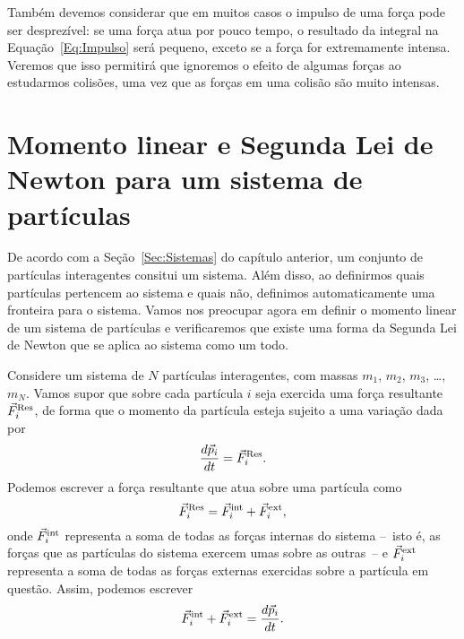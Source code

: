 Também devemos considerar que em muitos casos o impulso de uma força pode ser desprezível: se uma força atua por pouco tempo, o resultado da integral na Equação~\eqref{Eq:Impulso} será pequeno, exceto se a força for extremamente intensa. Veremos que isso permitirá que ignoremos o efeito de algumas forças ao estudarmos colisões, uma vez que as forças em uma colisão são muito intensas.

\section{Momento linear e Segunda Lei de Newton para um sistema de partículas}

De acordo com a Seção~\ref{Sec:Sistemas} do capítulo anterior, um conjunto de partículas interagentes consitui um sistema. Além disso, ao definirmos quais partículas pertencem ao sistema e quais não, definimos automaticamente uma fronteira para o sistema. Vamos nos preocupar agora em definir o momento linear de um sistema de partículas e verificaremos que existe uma forma da Segunda Lei de Newton que se aplica ao sistema como um todo.

Considere um sistema de $N$ partículas interagentes, com massas $m_1$, $m_2$, $m_3$, \dots, $m_N$. Vamos supor que sobre cada partícula $i$ seja exercida uma força resultante $\vec{F}_i^{\rm{Res}}$, de forma que o momento da partícula esteja sujeito a uma variação dada por
\begin{equation}
    \frac{d\vec{p}_i}{dt} = \vec{F}_i^{\rm{Res}}.
\end{equation}
%
Podemos escrever a força resultante que atua sobre uma partícula como
\begin{equation}
    \vec{F}_i^{\rm{Res}} = \vec{F}_i^{\rm{int}} + \vec{F}_i^{\rm{ext}},
\end{equation}
%
onde $\vec{F}_i^{\rm{int}}$ representa a soma de todas as forças internas do sistema --~isto é, as forças que as partículas do sistema exercem umas sobre as outras~-- e $\vec{F}_i^{\rm{ext}}$ representa a soma de todas as forças externas exercidas sobre a partícula em questão. Assim, podemos escrever
\begin{equation}
    \vec{F}_i^{\rm{int}} + \vec{F}_i^{\rm{ext}} = \frac{d\vec{p}_i}{dt}.
\end{equation}


